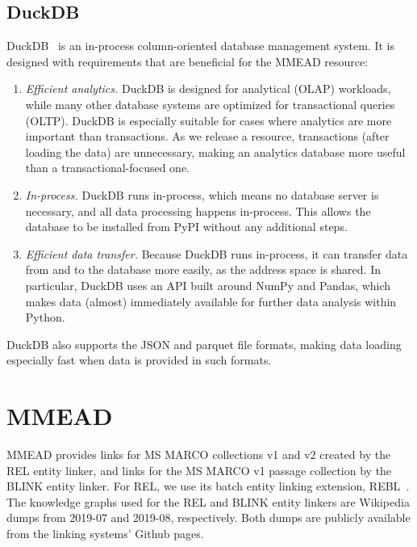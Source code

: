 \subsection{DuckDB}
DuckDB~\citep{duckdb} is an in-process column-oriented database management system. It is designed with requirements that are beneficial for the MMEAD resource:
\begin{enumerate}
    \item \emph{Efficient analytics.} DuckDB is designed for analytical (OLAP) workloads, while many other database systems are optimized for transactional queries (OLTP). DuckDB is especially suitable for cases where analytics are more important than transactions. As we release a resource, transactions (after loading the data) are unnecessary, making an analytics database more useful than a transactional-focused one.  
	\item \emph{In-process.} DuckDB runs in-process, which means no database server is necessary, and all data processing happens in-process. This allows the database to be installed from PyPI without any additional steps. 
	\item \emph{Efficient data transfer.} Because DuckDB runs in-process, it can transfer data from and to the database more easily, as the address space is shared. In particular, DuckDB uses an API built around NumPy and Pandas, which makes data (almost) immediately available for further data analysis within Python. 
\end{enumerate}
DuckDB also supports the JSON and parquet file formats, making data loading especially fast when data is provided in such formats.

\section{MMEAD}
MMEAD provides links for MS MARCO collections v1 and v2 created by the REL entity linker, and links for the MS MARCO v1 passage collection by the BLINK entity linker. For REL, we use its batch entity linking extension, REBL~\citep{rebl}. The knowledge graphs used for the REL and BLINK entity linkers are Wikipedia dumps from 2019-07 and 2019-08, respectively. Both dumps are publicly available from the linking systems' Github pages. 

